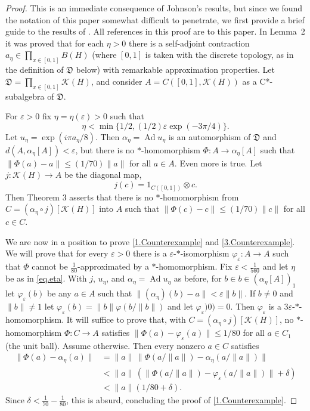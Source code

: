 \documentclass[11pt]{amsproc}
\DeclareMathOperator{\Ad}{Ad}
\newcommand{\cstar}{C*}
\newcommand{\cK}{\mathcal K}
\newcommand{\frD}{\mathfrak D}
\theoremstyle{definition}
\theoremstyle{plain}
\theoremstyle{remark}
\begin{document}
\begin{proof} This is an immediate consequence of Johnson's results, but  since we found the notation of this paper somewhat difficult to penetrate, we first provide a brief guide to the results of \cite{johnson1982counterexample}. All references in this proof  are to this paper. 
		In Lemma~2 it was proved that for each $\eta>0$ there is  a self-adjoint contraction $a_\eta\in \prod_{x\in [0,1]} B(H)$ (where $[0,1]$ is taken with the discrete topology, as in the definition of $\frD$ below) with remarkable approximation properties. 
	Let $\frD=\prod_{x\in [0,1]} \cK(H)$, and consider $A=C([0,1],\cK(H))$ as a \cstar-subalgebra of $\frD$. 


For $\varepsilon>0$ fix $\eta=\eta(\varepsilon)>0$ such that \begin{equation}\label{eq.eta}
\eta<\min\{1/2,(1/2)\varepsilon\exp(-3\pi/4)\}. 
\end{equation}
Let $u_\eta=\exp(i\pi a_\eta/8)$. Then $\alpha_\eta=\Ad u_\eta$ is an automorphism of $\frD$ and $d(A,\alpha_\eta [A])<\varepsilon$, but there is no $*$-homomorphism $\Phi\colon A\to \alpha_\eta[A]$ such that $\|\Phi(a)-a\| \leq (1/70)\|a\|$ for all $a\in A$. 
Even more is true. 
Let $j\colon \cK(H)\to A$ be the diagonal map, 
\[
j(c)=1_{C([0,1])}\otimes c. 
\]
Then Theorem 3 asserts that  there is no $*$-homomorphism from $C=(\alpha_\eta \circ j)[\cK(H)]$ into $A$ such that 
	$\|\Phi(c)-c\| \leq (1/70)\|c\|$ for all $c\in C$.  

	We  are now in a position to prove  \eqref{1.Counterexample} and \eqref{3.Counterexample}.   We will prove that 
	for every $\varepsilon>0$ there is a $\varepsilon$-$*$-isomorphism $\varphi_\varepsilon\colon A\to A$ such that $\Phi$ cannot be $\frac 1{80}$-approximated by a $*$-homomorphism. Fix $\varepsilon<\frac 1{560}$ and let $\eta$ be as in \eqref{eq.eta}.   With $j$, $u_\eta$, and $\alpha_\eta=\Ad u_\eta$  as before, for $b\in b\in (\alpha_\eta [A])_1$ let $\varphi_\varepsilon
	(b)$ be any $a\in A$ such that $\|(\alpha_\eta )(b)-a\|<\varepsilon\|b\|$. If $b\neq 0$ and $\|b\|\neq 1$ let $\varphi_\varepsilon(b)=\|b\|\varphi(b/\|b\|)$ and let $\varphi_\varepsilon)0)=0$. Then $\varphi_\varepsilon
	$ is a $3\varepsilon$-$*$-homomorphism. It will suffice to prove that, with $C=(\alpha_\eta \circ j)[\cK(H)]$,   no $*$-homomorphism $\Phi\colon C\to A$ satisfies $\|\Phi(a)-\varphi_\varepsilon(a)\|\leq 1/80$ for all $a\in C_1$ (the unit ball). Assume otherwise. Then  every nonzero $a\in C$ satisfies 
	\begin{align*}
		\|\Phi(a)-\alpha_\eta(a)\|&=\|a\|\,\|\Phi(a/\|a\|)-\alpha_\eta(a/\|a\|)\|\\
		&<\|a\|\, (\|\Phi(a/\|a\|)-\varphi_\varepsilon(a/\|a\|)\|+\delta)\\
		&< \|a\|(1/80+\delta). 
	\end{align*}  
	Since $\delta<\frac 1{70}-\frac 1{80}$, this is absurd, concluding the proof of \eqref{1.Counterexample}. 
	

\end{proof}
\end{document}
